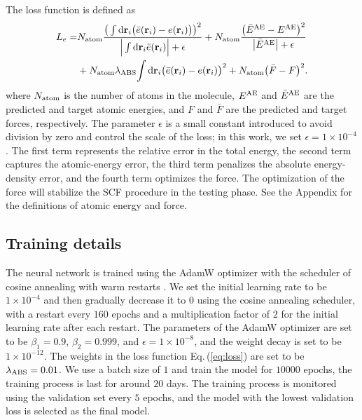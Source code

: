 \documentclass[%
twocolumn,
amsmath,
amssymb,
groupedaddress,
reprint,%
]{revtex4-2}
\renewcommand{\d}{{\rm d}}
\newcommand{\nl}{\nonumber \\}
\newcommand{\eq}[1]{Eq.\,(\ref{#1})}
\newcommand{\brm}[1]{\bm{\mathrm{#1}}}
\begin{document}
The loss function is defined as
\onecolumngrid
\begin{align}
  \label{eq:loss_self_scaled}
  L_{e} =
   & N_{\rm{atom}} \frac{\big(\int \d \brm{r}_{i} \big(\bar{e}(\brm{r}_{i}) - e(\brm{r}_{i})\big) \big)^2}{\Big| \int \d \brm{r}_{i} \bar{e}(\brm{r}_{i}) \Big| + \epsilon}
  + N_{\rm{atom}} \frac{\big(\bar{E}^{\rm{AE}} - E^{\rm{AE}} \big)^2}{\big| \bar{E}^{\rm{AE}} \big| + \epsilon} \nl
   & + N_{\rm{atom}} \lambda_{\rm{ABS}} {\int \d \brm{r}_{i} \big( \bar{e}(\brm{r}_{i}) - e(\brm{r}_{i}) \big)^2}
  + N_{\rm{atom}} \big(\bar{F} - F \big)^2.
\end{align}
\twocolumngrid
% 
where $N_{\rm{atom}}$ is the number of atoms in the molecule, $E^{\rm{AE}}$ and $\bar{E}^{\rm{AE}}$ are the predicted and target atomic energies, and $F$ and $\bar{F}$ are the predicted and target forces, respectively.
%
The parameter $\epsilon$ is a small constant introduced to avoid division by zero and control the scale of the loss; in this work, we set $\epsilon = 1 \times 10^{-4}$.
%
The first term represents the relative error in the total energy, the second term captures the atomic-energy error, the third term penalizes the absolute energy-density error, and the fourth term optimizes the force.
% 
The optimization of the force will stabilize the SCF procedure in the testing phase.
% 
See the Appendix for the definitions of atomic energy and force.

\subsection{Training details}
The neural network is trained using the AdamW optimizer \cite{loshchilovDecoupledWeightDecay2019-01-04} with the scheduler of cosine annealing with warm restarts \cite{loshchilovSGDRStochasticGradient2017-05-03}.
%
We set the initial learning rate to be $1 \times 10^{-4}$ and then gradually decrease it to $0$ using the cosine annealing scheduler, with a restart every $160$ epochs and a multiplication factor of $2$ for the initial learning rate after each restart.
%
The parameters of the AdamW optimizer are set to be $\beta_1 = 0.9$, $\beta_2 = 0.999$, and $\epsilon = 1 \times 10^{-8}$, and the weight decay is set to be $1 \times 10^{-12}$.
% 
The weights in the loss function \eq{eq:loss} are set to be $\lambda_{\rm{ABS}} = 0.01$.
%
We use a batch size of $1$ and train the model for $10000$ epochs, the training process is last for around $20$ days.
%
The training process is monitored using the validation set every $5$ epochs, and the model with the lowest validation loss is selected as the final model.
\end{document}
